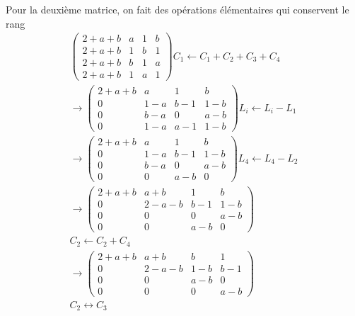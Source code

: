 Pour la deuxième matrice, on fait des opérations élémentaires qui conservent le rang 
\begin{multline*}
\begin{pmatrix}
  2+a+b &  a & 1 & b \\
  2+a+b &  1 & b & 1 \\
  2+a+b &  b & 1 & a \\
  2+a+b &  1 & a & 1
\end{pmatrix} C_1 \leftarrow C_1 + C_2 + C_3 + C_4\\
\rightarrow
\begin{pmatrix}
  2+a+b &  a  & 1   & b   \\
  0     & 1-a & b-1 & 1-b \\
  0     & b-a & 0   & a-b \\
  0     & 1-a & a-1 & 1-b
\end{pmatrix} L_i \leftarrow L_i - L_1\\
\rightarrow
\begin{pmatrix}
  2+a+b &  a  & 1   & b   \\
  0     & 1-a & b-1 & 1-b \\
  0     & b-a & 0   & a-b \\
  0     & 0   & a-b & 0
\end{pmatrix} L_4 \leftarrow L_4 - L_2 \\
\rightarrow
\begin{pmatrix}
  2+a+b & a+b   & 1   & b   \\
  0     & 2-a-b & b-1 & 1-b \\
  0     & 0     & 0   & a-b \\
  0     & 0     & a-b & 0
\end{pmatrix} \\ C_2 \leftarrow C_2 + C_4 \\
\rightarrow
\begin{pmatrix}
  2+a+b & a+b   & b   & 1   \\
  0     & 2-a-b & 1-b & b-1 \\
  0     & 0     & a-b & 0 \\
  0     & 0     & 0 & a-b
\end{pmatrix} \\ C_2 \leftrightarrow C_3
\end{multline*}

